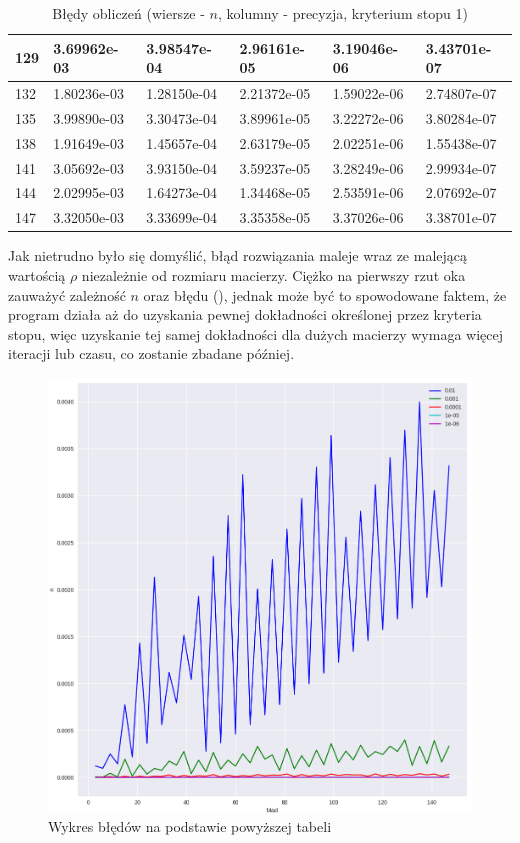 \documentclass{article}
\begin{document}
\begin{table}[H]
\begin{tabular}{|l|l|l|l|l|l|}
129 & 3.69962e-03 & 3.98547e-04 & 2.96161e-05 & 3.19046e-06 & 3.43701e-07 \\ \hline
132 & 1.80236e-03 & 1.28150e-04 & 2.21372e-05 & 1.59022e-06 & 2.74807e-07 \\ \hline
135 & 3.99890e-03 & 3.30473e-04 & 3.89961e-05 & 3.22272e-06 & 3.80284e-07 \\ \hline
138 & 1.91649e-03 & 1.45657e-04 & 2.63179e-05 & 2.02251e-06 & 1.55438e-07 \\ \hline
141 & 3.05692e-03 & 3.93150e-04 & 3.59237e-05 & 3.28249e-06 & 2.99934e-07 \\ \hline
144 & 2.02995e-03 & 1.64273e-04 & 1.34468e-05 & 2.53591e-06 & 2.07692e-07 \\ \hline
147 & 3.32050e-03 & 3.33699e-04 & 3.35358e-05 & 3.37026e-06 & 3.38701e-07 \\ \hline
\end{tabular}
\caption{Błędy obliczeń (wiersze - $n$, kolumny - precyzja, kryterium stopu 1)}
\end{table}

Jak nietrudno było się domyślić, błąd rozwiązania maleje wraz ze malejącą wartością $\rho$ niezależnie od rozmiaru
macierzy. Ciężko na pierwszy rzut oka zauważyć zależność $n$ oraz błędu (), jednak może być to spowodowane faktem, że program
działa aż do uzyskania pewnej dokładności określonej przez kryteria stopu, więc uzyskanie tej samej dokładności dla 
dużych macierzy wymaga więcej iteracji lub czasu, co zostanie zbadane później.

\begin{figure}[H]
    \centering
    \includegraphics[width=\textwidth]{img/plot_1.png}
    \caption{Wykres błędów na podstawie powyższej tabeli}
\end{figure}
\end{document}

